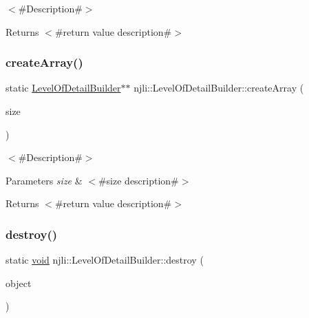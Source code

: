 $<$\#\+Description\#$>$

\begin{DoxyReturn}{Returns}
$<$\#return value description\#$>$ 
\end{DoxyReturn}
\mbox{\label{classnjli_1_1_level_of_detail_builder_a9f3853391a2a7d67228ce329bba8ca23}} 
\subsubsection{\texorpdfstring{create\+Array()}{createArray()}}
{\footnotesize\ttfamily static \mbox{\hyperlink{classnjli_1_1_level_of_detail_builder}{Level\+Of\+Detail\+Builder}}$\ast$$\ast$ njli\+::\+Level\+Of\+Detail\+Builder\+::create\+Array (\begin{DoxyParamCaption}\item[{const \mbox{\hyperlink{_util_8h_a10e94b422ef0c20dcdec20d31a1f5049}{u32}}}]{size }\end{DoxyParamCaption})\hspace{0.3cm}{\ttfamily [static]}}

$<$\#\+Description\#$>$


\begin{DoxyParams}{Parameters}
{\em size} & $<$\#size description\#$>$\\
\hline
\end{DoxyParams}
\begin{DoxyReturn}{Returns}
$<$\#return value description\#$>$ 
\end{DoxyReturn}
\mbox{\label{classnjli_1_1_level_of_detail_builder_a7e1cea8fe75376aad4380152b53dcb3c}} 
\subsubsection{\texorpdfstring{destroy()}{destroy()}}
{\footnotesize\ttfamily static \mbox{\hyperlink{_thread_8h_af1e856da2e658414cb2456cb6f7ebc66}{void}} njli\+::\+Level\+Of\+Detail\+Builder\+::destroy (\begin{DoxyParamCaption}\item[{\mbox{\hyperlink{classnjli_1_1_level_of_detail_builder}{Level\+Of\+Detail\+Builder}} $\ast$}]{object }\end{DoxyParamCaption})\hspace{0.3cm}{\ttfamily [static]}}

